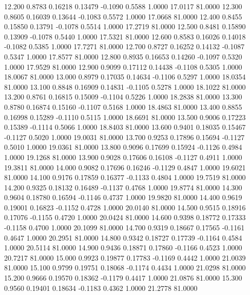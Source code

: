   12.200   0.8783   0.16218   0.13479  -0.1090   0.5588   1.0000  17.0117  81.0000
  12.300   0.8605   0.16039   0.13644  -0.1083   0.5572   1.0000  17.0668  81.0000
  12.400   0.8455   0.15850   0.13791  -0.1078   0.5514   1.0000  17.2719  81.0000
  12.500   0.8481   0.15890   0.13909  -0.1078   0.5440   1.0000  17.5321  81.0000
  12.600   0.8583   0.16026   0.14018  -0.1082   0.5385   1.0000  17.7271  81.0000
  12.700   0.8727   0.16252   0.14132  -0.1087   0.5347   1.0000  17.8577  81.0000
  12.800   0.8935   0.16653   0.14260  -0.1097   0.5320   1.0000  17.9529  81.0000
  12.900   0.9099   0.17112   0.14438  -0.1108   0.5305   1.0000  18.0067  81.0000
  13.000   0.8979   0.17035   0.14634  -0.1106   0.5297   1.0000  18.0354  81.0000
  13.100   0.8848   0.16909   0.14831  -0.1105   0.5278   1.0000  18.1022  81.0000
  13.200   0.8761   0.16815   0.15009  -0.1104   0.5226   1.0000  18.2838  81.0000
  13.300   0.8780   0.16874   0.15160  -0.1107   0.5168   1.0000  18.4863  81.0000
  13.400   0.8855   0.16998   0.15289  -0.1110   0.5115   1.0000  18.6691  81.0000
  13.500   0.9006   0.17223   0.15389  -0.1114   0.5066   1.0000  18.8403  81.0000
  13.600   0.9401   0.18035   0.15467  -0.1127   0.5020   1.0000  19.0031  81.0000
  13.700   0.9253   0.17896   0.15694  -0.1127   0.5010   1.0000  19.0361  81.0000
  13.800   0.9096   0.17699   0.15924  -0.1126   0.4984   1.0000  19.1268  81.0000
  13.900   0.9028   0.17606   0.16108  -0.1127   0.4911   1.0000  19.3811  81.0000
  14.000   0.9082   0.17696   0.16246  -0.1129   0.4847   1.0000  19.6021  81.0000
  14.100   0.9176   0.17859   0.16377  -0.1133   0.4804   1.0000  19.7519  81.0000
  14.200   0.9325   0.18132   0.16489  -0.1137   0.4768   1.0000  19.8774  81.0000
  14.300   0.9604   0.18780   0.16594  -0.1146   0.4737   1.0000  19.9820  81.0000
  14.400   0.9619   0.19001   0.16823  -0.1152   0.4728   1.0000  20.0140  81.0000
  14.500   0.9515   0.18916   0.17076  -0.1155   0.4720   1.0000  20.0424  81.0000
  14.600   0.9398   0.18772   0.17333  -0.1158   0.4700   1.0000  20.1099  81.0000
  14.700   0.9319   0.18667   0.17565  -0.1161   0.4647   1.0000  20.2951  81.0000
  14.800   0.9342   0.18727   0.17739  -0.1164   0.4584   1.0000  20.5114  81.0000
  14.900   0.9436   0.18871   0.17860  -0.1166   0.4523   1.0000  20.7217  81.0000
  15.000   0.9923   0.19877   0.17783  -0.1169   0.4442   1.0000  21.0039  81.0000
  15.100   0.9799   0.19751   0.18068  -0.1174   0.4434   1.0000  21.0298  81.0000
  15.200   0.9666   0.19570   0.18362  -0.1179   0.4417   1.0000  21.0876  81.0000
  15.300   0.9560   0.19401   0.18634  -0.1183   0.4362   1.0000  21.2778  81.0000
